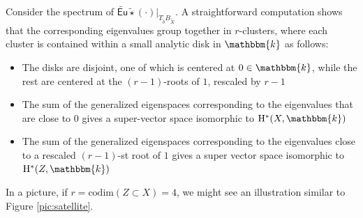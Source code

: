 \documentclass[12pt,a4paper]{amsart}
\theoremstyle{definition}
\theoremstyle{remark}
\begin{document}
Consider the spectrum of \(\widetilde{\mathsf{Eu}} \widetilde{\star} (\cdot) |_{T_{\widetilde{b}} B_{\widetilde{X}}}\). A straightforward computation shows that the corresponding eigenvalues group together in \(r\)-clusters, where each cluster is contained within a small analytic disk in \(\mathbbm{k}\) as follows:
\begin{itemize}
\item The disks are disjoint, one of which is centered at $0\in \mathbbm{k}$, while the rest are centered at the $(r-1)$-roots of $1$, rescaled by $r-1$
\item The sum of the generalized eigenspaces corresponding to the eigenvalues that are close to $0$ gives a super-vector space isomorphic to $\mathrm{H}^{\ast}(X,\mathbbm{k})$
\item The sum of the generalized eigenspaces corresponding to the eigenvalues close to a rescaled $(r-1)$-st root of $1$ gives a super vector space isomorphic to $\mathrm{H}^{\ast}(Z,\mathbbm{k})$
\end{itemize}
In a picture, if $r=\mathrm{codim}(Z\subset X)=4$, we might see an illustration similar to Figure \ref{pic:satellite}.
\end{document}

